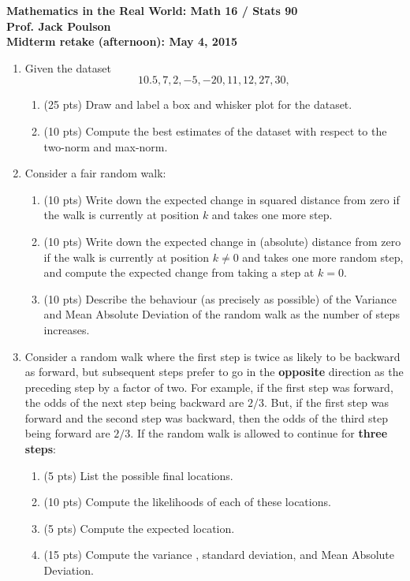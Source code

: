 \documentclass[11pt]{article}
\begin{document}
\noindent
{\bf Mathematics in the Real World: Math 16 / Stats 90}\\
{\bf Prof. Jack Poulson}\\
{\bf Midterm retake (afternoon): May 4, 2015}\\

\begin{enumerate}

\item
  Given the dataset 
  \[
    10.5, 7, 2, -5, -20, 11, 12, 27, 30,
  \]
  \begin{enumerate}
  \item
   (25 pts) Draw and label a box and whisker plot for the dataset.
  \item 
   (10 pts) Compute the best estimates of the dataset with respect to the 
            two-norm and max-norm.
  \end{enumerate}

\item 
  Consider a fair random walk:
  \begin{enumerate}
  \item
    (10 pts) Write down the expected change in squared distance from zero
             if the walk is currently at position $k$ and takes one more
             step.
  \item
    (10 pts) Write down the expected change in (absolute) distance from zero
             if the walk is currently at position $k \neq 0$ and takes one more
             random step, and compute the expected change from taking a step
             at $k = 0$.
  \item
    (10 pts) Describe the behaviour (as precisely as possible) of the Variance
             and Mean Absolute Deviation of the random walk as the number of 
             steps increases.
  \end{enumerate}

\item
  Consider a random walk where the first step is twice as likely to be backward
  as forward, but subsequent steps prefer to go in the {\bf opposite} direction
  as the preceding step by a factor of two.
  For example, if the first step was forward, the odds of the next step being
  backward are $2/3$. But, if the first step was forward and the second step 
  was backward, then the odds of the third step being forward are $2/3$.
  If the random walk is allowed to continue for {\bf three steps}:
  \begin{enumerate}
  \item (5 pts) List the possible final locations.
  \item (10 pts) Compute the likelihoods of each of these locations.
  \item (5 pts) Compute the expected location.
  \item (15 pts) Compute the variance , standard deviation, and 
                 Mean Absolute Deviation.
  \end{enumerate}
\end{enumerate}
\end{document}
